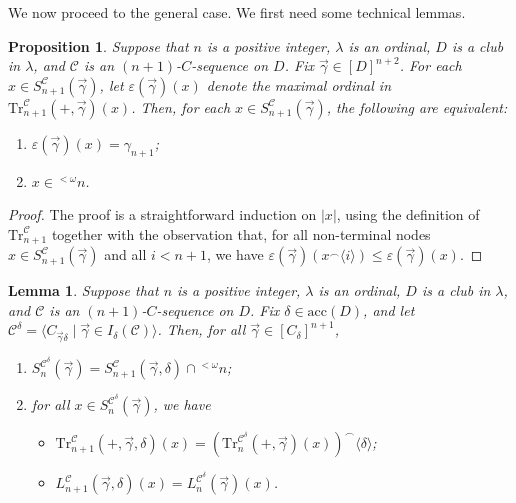 \documentclass{amsart}
\numberwithin{theorem}{section}
\newtheorem{lemma}[theorem]{Lemma}
\newtheorem{proposition}[theorem]{Proposition}
\theoremstyle{definition}
\newcommand{\acc}{\mathrm{acc}}
\newcommand{\mc}{\mathcal}
\newcommand{\Tr}{\mathrm{Tr}}
\begin{document}
We now proceed to the general case. We first need some technical lemmas.

\begin{proposition} \label{prop: prop_613}
  Suppose that $n$ is a positive integer, $\lambda$ is an ordinal, 
  $D$ is a club in $\lambda$, and $\mc{C}$ is an $(n+1)$-$C$-sequence on $D$. 
  Fix $\vec{\gamma} \in [D]^{n+2}$. For each $x \in S^{\mc{C}}_{n+1}(\vec{\gamma})$, 
  let $\varepsilon(\vec{\gamma})(x)$ denote the maximal ordinal in 
  $\Tr^{\mc{C}}_{n+1}(+,\vec{\gamma})(x)$. Then, for each $x \in 
  S^{\mc{C}}_{n+1}(\vec{\gamma})$, the following are equivalent:
  \begin{enumerate}
    \item $\varepsilon(\vec{\gamma})(x) = \gamma_{n+1}$;
    \item $x \in {^{<\omega}}n$.
  \end{enumerate}
\end{proposition}

\begin{proof}
  The proof is a straightforward induction on $|x|$, using the definition of 
  $\Tr^{\mc{C}}_{n+1}$ together with the observation that, for all 
  non-terminal nodes $x \in S^{\mc{C}}_{n+1}(\vec{\gamma})$ and all 
  $i < n+1$, we have $\varepsilon(\vec{\gamma})(x^\frown \langle i \rangle) 
  \leq \varepsilon(\vec{\gamma})(x)$.
\end{proof}

\begin{lemma} \label{lemma: dimension_reduction}
  Suppose that $n$ is a positive integer, $\lambda$ is an ordinal, $D$ is a club 
  in $\lambda$, and $\mc{C}$ is an $(n+1)$-$C$-sequence on $D$. 
  Fix $\delta \in \acc(D)$, and 
  let $\mc{C}^\delta = \langle C_{\vec{\gamma}\delta} \mid \vec{\gamma} \in I_\delta(\mc{C}) 
  \rangle$. Then, for all $\vec{\gamma} \in [C_\delta]^{n+1}$, 
  \begin{enumerate}
    \item $S^{\mc{C}^\delta}_n(\vec{\gamma}) = S^{\mc{C}}_{n+1}(\vec{\gamma},\delta) 
    \cap {^{<\omega}}n$;
    \item for all $x \in S^{\mc{C}^\delta}_n(\vec{\gamma})$, we have
    \begin{itemize}
      \item $\Tr^{\mc{C}}_{n+1}(+,\vec{\gamma},\delta)(x) = 
      (\Tr^{\mc{C}^\delta}_n(+,\vec{\gamma})(x))^\frown \langle 
      \delta \rangle$;
      \item $L_{n+1}^{\mc{C}}(\vec{\gamma},\delta)(x) = 
      L_n^{\mc{C}^\delta}(\vec{\gamma})(x)$.
    \end{itemize}
  \end{enumerate}
\end{lemma}
\end{document}
